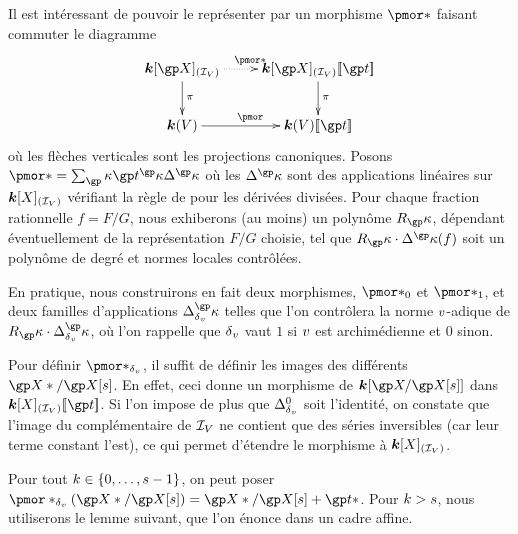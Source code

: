 Il est intéressant de pouvoir le représenter par un morphisme \( \pmor* \)
faisant commuter le diagramme
\begin{equation} \label{e:pmor} %
  \xymatrix{
    \cdn[\vp]_{(\ideal\anyvar)}                 \ar[d]^\pi \ar@{.>}[r]^{\pmor*}
    & \cdn[\vp]_{(\ideal\anyvar)} \series\psp   \ar[d]^\pi
    \\ \cdn(\anyvar)                                           \ar[r]^{\pmor}
    & \cdn(\anyvar)\series\psp
  }
\end{equation}
où les flèches verticales sont les projections canoniques. Posons
\( \pmor* = \sum_\derp \psp^\derp \pdiff*^\derp \) où les \( \pdiff*^\derp \)
sont des applications linéaires sur \( {\boldsymbol k}[X]_{(\mathcal I_{V})} \) vérifiant
la règle de  pour les dérivées divisées. Pour chaque fraction
rationnelle \( f = F/G \), nous exhiberons (au moins) un polynôme \( R_\derp
\), dépendant éventuellement de la représentation \( F/G \) choisie, tel que
\( R_\derp \cdot \pdiff*^\derp(f) \) soit un polynôme de degré et normes
locales contrôlées.

En pratique, nous construirons en fait deux morphismes, \( \pmor*_0 \) et \(
  \pmor*_1 \), et deux familles d'applications \( \pdiff^\derp \) telles que
l'on contrôlera la norme \( v \)-adique de \( R_\derp \cdot \pdiff^\derp
\), où l'on rappelle que \( {\delta\smash{_v}} \) vaut \( 1 \) si \( v \) est
archimédienne et \( 0 \) sinon.

Pour définir \( \pmor*_\dv \), il suffit de définir les images des différents
\( \vp* / \vp[\anydim] \). En effet, ceci donne un morphisme de \( \cdn[ \vp /
  \vp[\anydim] ] \) dans \( \cdn[X]_{(\ideal\anyvar)} \series\psp \). Si l'on
impose de plus que \( \pdiff^0 \) soit l'identité, on constate que l'image du
complémentaire de \( \mathcal I_{V} \) ne contient que des séries inversibles
(car leur terme constant l'est), ce qui permet d'étendre le morphisme à \(
  {\boldsymbol k}[X]_{(\mathcal I_{V})} \).

Pour tout \( k \in \lbrace0, \dots, s-1\rbrace \), on peut poser \(
  \pmor*_\dv(\vp*/\vp[\anydim]) = \vp*/\vp[\anydim] + \psp* \). Pour \( k >
  s \), nous utiliserons le lemme suivant, que l'on énonce dans un cadre
affine.

